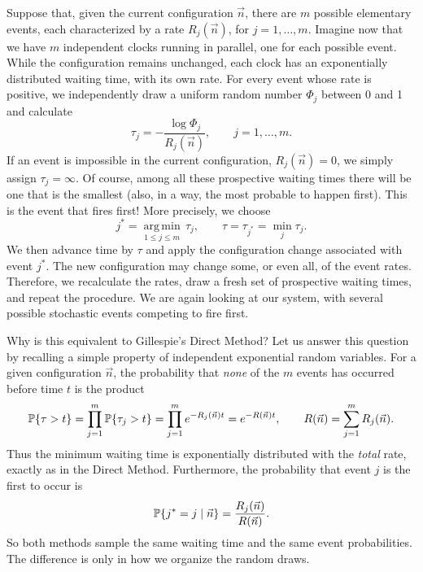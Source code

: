 Suppose that, given the current configuration $\vec n$, there are $m$ possible elementary events, each characterized by a rate $R_j(\vec n)$, for $j=1,\ldots,m$. Imagine now that we have $m$ independent clocks running in parallel, one for each possible event. While the configuration remains unchanged, each clock has an exponentially distributed waiting time, with its own rate. For every event whose rate is positive, we independently draw a uniform random number $\Phi_j$ between 0 and 1 and calculate
\begin{equation}
 \tau_j=-\frac{\log\Phi_j}{R_j(\vec n)}, \qquad j=1,\ldots,m.
 \label{First_Reaction_Clocks}
\end{equation}
If an event is impossible in the current configuration, $R_j(\vec n)=0$, we simply assign $\tau_j=\infty$. Of course, among all these prospective waiting times there will be one that is the smallest (also, in a way, the most probable to happen first). This is the event that fires first! More precisely, we choose
\begin{equation}
 j^*=\underset{1\leq j\leq m}{\operatorname{arg\,min}}\,\tau_j,
 \qquad \tau=\tau_{j^*}=\min_j\tau_j.
 \label{First_Reaction_Minimum}
\end{equation}
We then advance time by $\tau$ and apply the configuration change associated with event $j^*$. The new configuration may change some, or even all, of the event rates. Therefore, we recalculate the rates, draw a fresh set of prospective waiting times, and repeat the procedure. We are again looking at our system, with several possible stochastic events competing to fire first.
\smallskip

Why is this equivalent to Gillespie's Direct Method? Let us answer this question by recalling a simple property of independent exponential random variables. For a given configuration $\vec n$, the probability that \emph{none} of the $m$ events has occurred before time $t$ is the product
\begin{equation}
 {\mathbb P}\{\tau>t\}
 =\prod_{j=1}^{m}{\mathbb P}\{\tau_j>t\}
 =\prod_{j=1}^{m}e^{-R_j(\vec n)t}
 =e^{-R(\vec n)t},
 \qquad R(\vec n)=\sum_{j=1}^{m}R_j(\vec n).
 \label{First_Reaction_Survival}
\end{equation}
Thus the minimum waiting time is exponentially distributed with the \emph{total} rate, exactly as in the Direct Method. Furthermore, the probability that event $j$ is the first to occur is
\begin{equation}
 {\mathbb P}\{j^*=j\mid\vec n\}
 =\frac{R_j(\vec n)}{R(\vec n)}.
 \label{First_Reaction_Choice}
\end{equation}
So both methods sample the same waiting time and the same event probabilities. The difference is only in how we organize the random draws.
\smallskip

